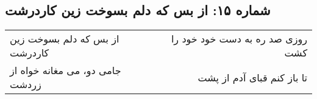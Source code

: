 \begin{center}
\section*{شماره ۱۵: از بس که دلم بسوخت زین کاردرشت}
\label{sec:015}
\begin{longtable}{l p{0.5cm} r}
از بس که دلم بسوخت زین کاردرشت
&&
روزی صد ره به دست خود خود را کشت
\\
جامی دو، می مغانه خواه از زردشت
&&
تا باز کنم قبای آدم از پشت
\\
\end{longtable}
\end{center}
